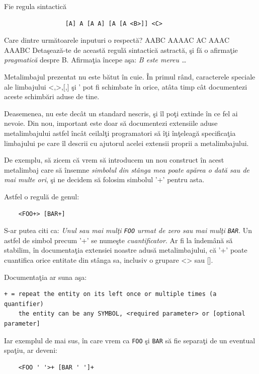 \begin{Exercise}[title={Reguli sintactice},difficulty=1]
Fie regula sintactică
\begin{verbatim}
                 [A] A [A A] [A [A <B>]] <C>
\end{verbatim}
\ExePart
Care dintre următoarele inputuri o respectă?
\Question AABC %
\Question AAAAC %
\Question AC %
\Question AAAC %
\Question AAABC %
\ExePart
Detaşează-te de această regulă sintactică astractă, şi fă o afirmaţie
\textit{pragmatică} despre B. Afirmaţia începe aşa:
\textit{B este mereu \ldots} %
\end{Exercise}

Metalimbajul prezentat nu este bătut în cuie. În primul rând,
caracterele speciale ale limbajului <,>,[,] şi ' pot fi schimbate
în orice, atâta timp cât documentezi aceste schimbări aduse de tine.

Deasemenea, nu este decât un standard nescris, şi îl poţi
extinde în ce fel ai nevoie. Din nou, important este doar
să documentezi {\glqq}extensiile{\grqq} aduse metalimbajului astfel
încât ceilalţi programatori să îţi înţeleagă specificaţia
limbajului pe care îl descrii cu ajutorul acelei
extensii proprii a metalimbajului.

De exemplu, să zicem că vrem să introducem un nou
construct în acest metalimbaj care să însemne \textit{simbolul
din stânga mea poate apărea o dată sau de mai multe ori}, şi
ne decidem să folosim simbolul '+' pentru asta.

Astfel o regulă de genul:
\begin{verbatim}
	<FOO+> [BAR+]
\end{verbatim}
S-ar putea citi ca: \textit{Unul sau mai mulţi \texttt{FOO} urmat de zero sau mai
mulţi \texttt{BAR}}. Un astfel de simbol precum '+' se numeşte \textsl{cuantificator}.
Ar fi la îndemână să stabilim, în documentaţia extensiei noastre adusă metalimbajului,
că '+' poate cuantifica orice entitate din stânga sa, inclusiv o grupare <> sau [].

Documentaţia ar suna aşa:
\begin{verbatim}
+ = repeat the entity on its left once or multiple times (a quantifier)
    the entity can be any SYMBOL, <required parameter> or [optional parameter]
\end{verbatim}
Iar exemplul de mai sus, în care vrem ca \texttt{FOO} şi \texttt{BAR}
să fie separaţi de un eventual spaţiu, ar deveni:
\begin{verbatim}
	<FOO ' '>+ [BAR ' ']+
\end{verbatim}


